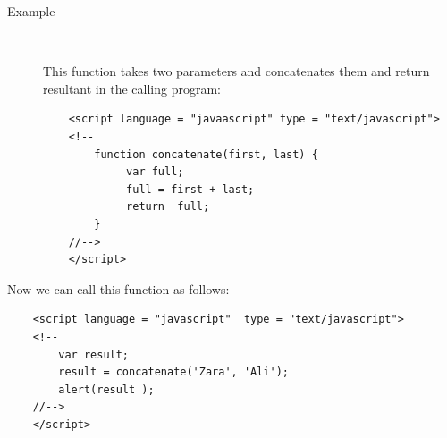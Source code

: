 \documentclass[11pt,a4paper]{article}
\begin{document}
\begin{description}
\item[Example]\

This function takes two parameters and concatenates them and return resultant in the calling program:

\begin{verbatim}
    <script language = "javaascript" type = "text/javascript">
    <!--
        function concatenate(first, last) {
             var full;
             full = first + last;
             return  full;
        }
    //-->
    </script>
\end{verbatim}
\end{description}
Now we can call this function as follows:


\begin{verbatim}
    <script language = "javascript"  type = "text/javascript">
    <!--
        var result;
        result = concatenate('Zara', 'Ali');
        alert(result );
    //-->
    </script>
\end{verbatim}
\end{document}
